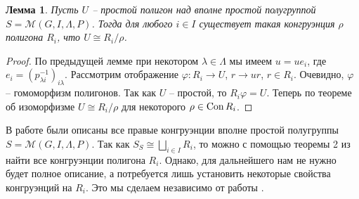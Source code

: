 \documentclass[a4paper]{article}
\newtheorem{lemma}{Лемма}
\newcommand{\Con}{\textnormal{Con}\, }
\begin{document}
	\begin{lemma} \label{l2.2}
		Пусть $U$ -- простой полигон над вполне простой полугруппой $S = \mathcal{M}(G,I,\Lambda,P)$. Тогда для любого $i \in I$ существует такая конгруэнция $\rho$ полигона $R_i$, что $U \cong {R_i}/{\rho}$.
	\end{lemma}
	\begin{proof}
		По предыдущей лемме при некотором $\lambda \in \Lambda$ мы имеем $u = u e_i$, где $e_i = (p_{\lambda i}^{-1})_{i \lambda}$. Рассмотрим отображение $\varphi: R_i \rightarrow U$, $r \rightarrow ur$, $r \in R_i$. Очевидно, $\varphi$ -- гомоморфизм полигонов. Так как $U$ -- простой, то $R_i \varphi = U$. Теперь по теореме об изоморфизме $U \cong {R_i}/{\rho}$ для некоторого $\rho \in \Con R_i$.
	\end{proof}
	
	\par В работе \cite{oehmke} были описаны все правые конгруэнции вполне простой полугруппы $S = \mathcal{M}(G,I,\Lambda,P)$. Так как $S_S \cong \bigsqcup_{i \in I} R_i$, то можно с помощью теоремы 2 из \cite{oehmke} найти все конгруэнции полигона $R_i$. Однако, для дальнейшего нам не нужно будет полное описание, а потребуется лишь установить некоторые свойства конгруэнций на $R_i$. Это мы сделаем независимо от работы \cite{oehmke}.
	
\end{document}
